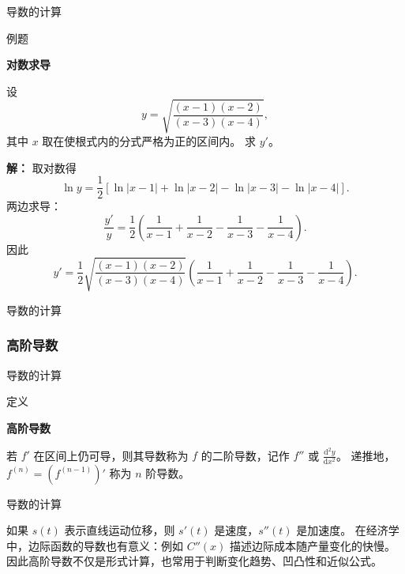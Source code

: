 \documentclass[aspectratio=169,10pt,fontset=fandol]{ctexbeamer}
\newcommand{\dd}{\mathrm{d}}
\begin{document}
\begin{frame}[t,fragile]{导数的计算}
\small
\begin{block}{例题}
{\small
\textbf{对数求导}\par

	设
	\[
	y=\sqrt{\frac{(x-1)(x-2)}{(x-3)(x-4)}},
	\]
	其中 $x$ 取在使根式内的分式严格为正的区间内。 求 $y'$。

}
\end{block}
\pause
{\small
\textbf{解：}
取对数得
	\[
	\ln y=\frac12\left[\ln|x-1|+\ln|x-2|-\ln|x-3|-\ln|x-4|\right].
	\]
	两边求导：
	\[
	\frac{y'}{y}
	=\frac12\left(\frac1{x-1}+\frac1{x-2}-\frac1{x-3}-\frac1{x-4}\right).
	\]
	因此
	\[
	y'=\frac12\sqrt{\frac{(x-1)(x-2)}{(x-3)(x-4)}}
	\left(\frac1{x-1}+\frac1{x-2}-\frac1{x-3}-\frac1{x-4}\right).
	\]

}
\end{frame}
\begin{frame}[t,fragile]{导数的计算}
\normalsize
{\normalsize

\subsubsection*{高阶导数}


}
\end{frame}
\begin{frame}[t,fragile]{导数的计算}
\normalsize
\begin{block}{定义}
{\normalsize
\textbf{高阶导数}\par

若 $f'$ 在区间上仍可导，则其导数称为 $f$ 的二阶导数，记作 $f''$ 或 $\frac{\dd^2y}{\dd x^2}$。 递推地，$f^{(n)}=(f^{(n-1)})'$ 称为 $n$ 阶导数。

}
\end{block}
\end{frame}
\begin{frame}[t,fragile]{导数的计算}
\normalsize
{\normalsize
如果 $s(t)$ 表示直线运动位移，则 $s'(t)$ 是速度，$s''(t)$ 是加速度。 在经济学中，边际函数的导数也有意义：例如 $C''(x)$ 描述边际成本随产量变化的快慢。 因此高阶导数不仅是形式计算，也常用于判断变化趋势、凹凸性和近似公式。


}
\end{frame}
\end{document}
